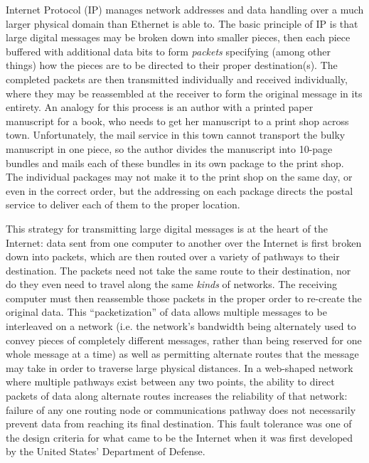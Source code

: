Internet Protocol (IP) manages network addresses and data handling over a much larger physical domain than Ethernet is able to.  The basic principle of IP is that large digital messages may be broken down into smaller pieces, then each piece buffered with additional data bits to form \textit{packets} specifying (among other things) how the pieces are to be directed to their proper destination(s).  The completed packets are then transmitted individually and received individually, where they may be reassembled at the receiver to form the original message in its entirety.  An analogy for this process is an author with a printed paper manuscript for a book, who needs to get her manuscript to a print shop across town.  Unfortunately, the mail service in this town cannot transport the bulky manuscript in one piece, so the author divides the manuscript into 10-page bundles and mails each of these bundles in its own package to the print shop.  The individual packages may not make it to the print shop on the same day, or even in the correct order, but the addressing on each package directs the postal service to deliver each of them to the proper location.  

This strategy for transmitting large digital messages is at the heart of the Internet: data sent from one computer to another over the Internet is first broken down into packets, which are then routed over a variety of pathways to their destination.  The packets need not take the same route to their destination, nor do they even need to travel along the same \textit{kinds} of networks.  The receiving computer must then reassemble those packets in the proper order to re-create the original data.  This ``packetization'' of data allows multiple messages to be interleaved on a network (i.e. the network's bandwidth being alternately used to convey pieces of completely different messages, rather than being reserved for one whole message at a time) as well as permitting alternate routes that the message may take in order to traverse large physical distances.  In a web-shaped network where multiple pathways exist between any two points, the ability to direct packets of data along alternate routes increases the reliability of that network: failure of any one routing node or communications pathway does not necessarily prevent data from reaching its final destination.  This fault tolerance was one of the design criteria for what came to be the Internet when it was first developed by the United States' Department of Defense.

